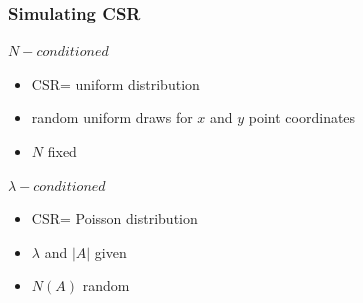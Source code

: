 \documentclass[nototal,handout]{beamer}
\begin{document}
 \begin{frame}
   \frametitle{Simulating CSR}
   \begin{block}{$N-conditioned$}
     \begin{itemize}
       \item CSR= uniform distribution
       \item random uniform draws for $x$ and $y$ point coordinates
       \item $N$ fixed
     \end{itemize}
    \end{block}
\begin{block}{$\lambda-conditioned$}
     \begin{itemize}
       \item CSR= Poisson distribution
       \item $\lambda$ and $|A|$ given
       \item $N(A)$ random
     \end{itemize}
    \end{block}
  \end{frame}
\end{document}
